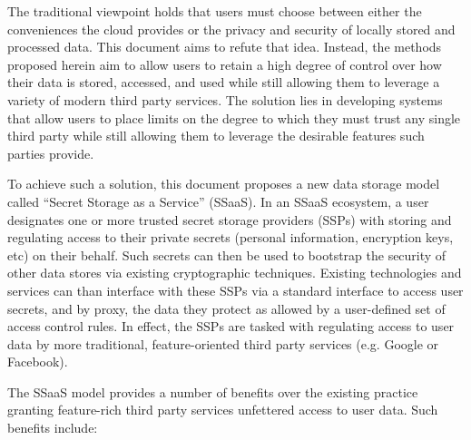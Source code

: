 The traditional viewpoint holds that users must choose between either
the conveniences the cloud provides or the privacy and security of
locally stored and processed data. This document aims to refute that
idea. Instead, the methods proposed herein aim to allow users to
retain a high degree of control over how their data is stored,
accessed, and used while still allowing them to leverage a variety of
modern third party services. The solution lies in developing systems
that allow users to place limits on the degree to which they must
trust any single third party while still allowing them to leverage the
desirable features such parties provide.

To achieve such a solution, this document proposes a new data storage
model called ``Secret Storage as a Service'' (SSaaS). In an SSaaS
ecosystem, a user designates one or more trusted secret storage
providers (SSPs) with storing and regulating access to their private
secrets (personal information, encryption keys, etc) on their
behalf. Such secrets can then be used to bootstrap the security of
other data stores via existing cryptographic techniques. Existing
technologies and services can than interface with these SSPs via a
standard interface to access user secrets, and by proxy, the data they
protect as allowed by a user-defined set of access control rules. In
effect, the SSPs are tasked with regulating access to user data by
more traditional, feature-oriented third party services (e.g. Google or
Facebook).

The SSaaS model provides a number of benefits over the existing
practice granting feature-rich third party services unfettered access
to user data. Such benefits include:

